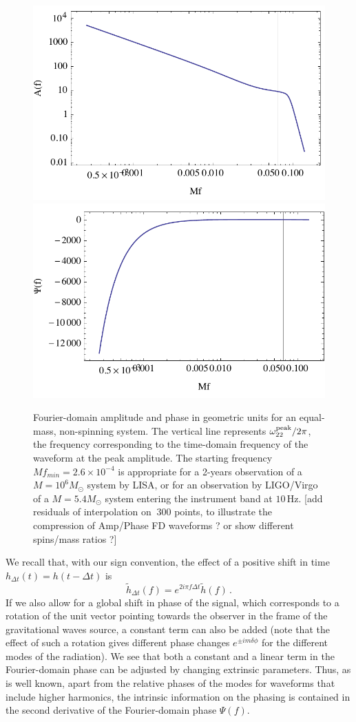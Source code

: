 \documentclass[aps,showpacs,%
prd,superscriptaddress,nofootinbib]{revtex4}
\newcommand{\be}{\begin{equation}}
\newcommand{\ee}{\end{equation}}
\newcommand{\Hz}{\,\mathrm{Hz}}
\begin{document}
\begin{figure}
  \centering
  \includegraphics[width=.48\linewidth]{plots/Af.pdf}
  \hspace{0.2cm}
  \includegraphics[width=.48\linewidth]{plots/Psif.pdf}
  \caption{Fourier-domain amplitude and phase in geometric units for an equal-mass, non-spinning system. The vertical line represents $\omega_{22}^{\rm peak}/2\pi$, the frequency corresponding to the time-domain frequency of the waveform at the peak amplitude. The starting frequency $Mf_{min} = 2.6\times 10^{-4}$ is appropriate for a 2-years observation of a $M=10^{6} M_{\odot}$ system by LISA, or for an observation by LIGO/Virgo of a $M=5.4 M_{\odot}$ system entering the instrument band at $10\Hz$. [add residuals of interpolation on $~300$ points, to illustrate the compression of Amp/Phase FD waveforms ? or show different spins/mass ratios ?]}
  \label{fig:ampphase}
\end{figure}

We recall that, with our sign convention, the effect of a positive shift in time $h_{\Delta t} (t) = h(t- \Delta t)$ is
\be
	\tilde{h}_{\Delta t}(f) = e^{2i\pi f \Delta t} \tilde{h}(f) \,.
\ee
If we also allow for a global shift in phase of the signal, which corresponds to a rotation of the unit vector pointing towards the observer in the frame of the gravitational waves source, a constant term can also be added (note that the effect of such a rotation gives different phase changes $e^{\pm i m \delta \phi}$ for the different modes of the radiation). We see that both a constant and a linear term in the Fourier-domain phase can be adjusted by changing extrinsic parameters. Thus, as is well known, apart from the relative phases of the modes for waveforms that include higher harmonics, the intrinsic information on the phasing is contained in the second derivative of the Fourier-domain phase $\Psi(f)$.
\end{document}
